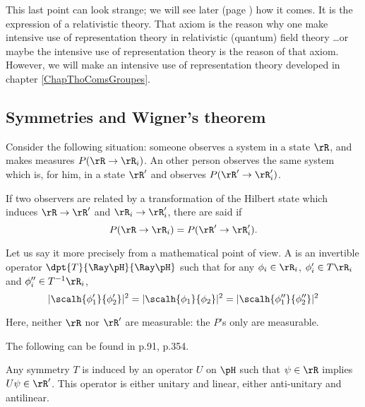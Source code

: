This last point can look strange; we will see later (page \pageref{pg:poincare_act}) how it comes. It is the expression of a relativistic theory. That axiom is the reason why one make intensive use of representation theory in relativistic (quantum) field theory \ldots or maybe the intensive use of representation theory is the reason of that axiom. However, we will make an intensive use of representation theory developed in chapter \ref{ChapThoComsGroupes}.

\subsection{Symmetries and Wigner's theorem}

Consider the following situation: someone observes a system in a state $\rR$, and makes measures $P(\rR\to\rR_i)$. An other person observes the same system which is, for him, in a state $\rR'$ and observes $P(\rR'\to\rR'_i)$.

If two observers are related by a transformation of the Hilbert state which induces $\rR\to\rR'$ and $\rR_i\to\rR_i'$, there are said  if 
\begin{equation}\label{eq:sym_isom}
   P(\rR\to\rR_i)=P(\rR'\to\rR'_i).
\end{equation}

Let us say it more precisely from a mathematical point of view. A  is an invertible operator $\dpt{T}{\Ray\pH}{\Ray\pH}$ such that for any $\phi_i\in\rR_i$, $\phi_i'\in T\rR_i$ and $\phi''_i\in T^{-1}\rR_i$, 
\begin{equation}\label{eq:}
  |\scalh{\phi'_1}{\phi'_2}|^2=|\scalh{\phi_1}{\phi_2}|^2=|\scalh{\phi''_1}{\phi''_2}|^2
\end{equation}


\begin{remark}
Here, neither $\rR$ nor $\rR'$ are measurable: the $P$'s only are measurable.
\end{remark}

The following can be found in  \cite{Weinberg} p.91, \cite{Sternberg} p.354.
\begin{theorem}[Wigner]\label{tho:Wigner}
Any symmetry $T$ is induced by an operator $U$ on $\pH$ such that $\psi\in\rR$ implies $U\psi\in\rR'$. This operator is either unitary and linear, either anti-unitary and antilinear.
\end{theorem}

